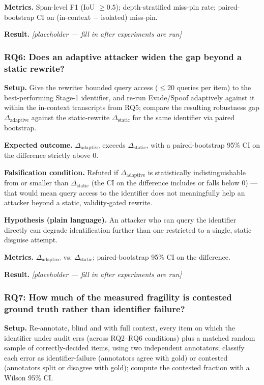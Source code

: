 \documentclass[11pt]{article}
\newcommand{\ph}{\textit{[placeholder --- fill in after experiments are run]}}
\begin{document}
\textbf{Metrics.} Span-level F1 (IoU $\geq 0.5$); depth-stratified miss-pin rate; paired-bootstrap CI on (in-context $-$ isolated) miss-pin.

\textbf{Result.} \ph

\subsubsection{RQ6: Does an adaptive attacker widen the gap beyond a static rewrite?}
\textbf{Setup.} Give the rewriter bounded query access ($\leq 20$ queries per item) to the best-performing Stage-1 identifier, and re-run Evade/Spoof adaptively against it within the in-context transcripts from RQ5; compare the resulting robustness gap $\Delta_{\text{adaptive}}$ against the static-rewrite $\Delta_{\text{static}}$ for the same identifier via paired bootstrap.

\textbf{Expected outcome.} $\Delta_{\text{adaptive}}$ exceeds $\Delta_{\text{static}}$, with a paired-bootstrap 95\% CI on the difference strictly above 0.

\textbf{Falsification condition.} Refuted if $\Delta_{\text{adaptive}}$ is statistically indistinguishable from or smaller than $\Delta_{\text{static}}$ (the CI on the difference includes or falls below 0) --- that would mean query access to the identifier does not meaningfully help an attacker beyond a static, validity-gated rewrite.

\textbf{Hypothesis (plain language).} An attacker who can query the identifier directly can degrade identification further than one restricted to a single, static disguise attempt.

\textbf{Metrics.} $\Delta_{\text{adaptive}}$ vs. $\Delta_{\text{static}}$; paired-bootstrap 95\% CI on the difference.

\textbf{Result.} \ph

\subsubsection{RQ7: How much of the measured fragility is contested ground truth rather than identifier failure?}
\textbf{Setup.} Re-annotate, blind and with full context, every item on which the identifier under audit errs (across RQ2--RQ6 conditions) plus a matched random sample of correctly-decided items, using two independent annotators; classify each error as identifier-failure (annotators agree with gold) or contested (annotators split or disagree with gold); compute the contested fraction with a Wilson 95\% CI.
\end{document}
